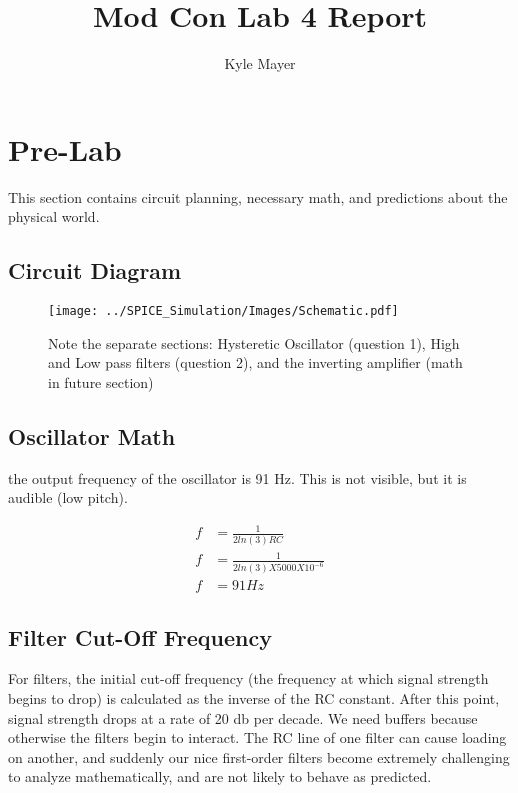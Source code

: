 \documentclass[11pt]{article} %
\title{Mod Con Lab 4 Report}
\author{Kyle Mayer}
\begin{document}
\maketitle


\section{Pre-Lab}
This section contains circuit planning, necessary math, and predictions about the physical world. 


\subsection{Circuit Diagram}
\begin{figure} [!ht]
	\centering
	\texttt{[image: ../SPICE\_Simulation/Images/Schematic.pdf]}
	\caption {Note the separate sections: Hysteretic Oscillator (question 1), High and Low pass filters (question 2), and the inverting amplifier (math in future section)} %
	\label{fig:circuit_Diagram} %
	
\end{figure}

\subsection{Oscillator Math}
the output frequency of the oscillator is 91 Hz. This is not visible, but it is audible (low pitch).

\begin{align} %
f &= \frac{1}{2ln(3)RC}\\ 
f &= \frac{1}{2ln(3)X5000X10^{-6}}\\ 
f &= 91 Hz
\end{align}

\subsection{Filter Cut-Off Frequency}
For filters, the initial cut-off frequency (the frequency at which signal strength begins to drop) is calculated as the inverse of the RC constant. After this point, signal strength drops at a rate of 20 db per decade.
We need buffers because otherwise the filters begin to interact. The RC line of one filter can cause loading on another, and suddenly our nice first-order filters become extremely challenging to analyze mathematically, and are not likely to behave as predicted.
\end{document}
